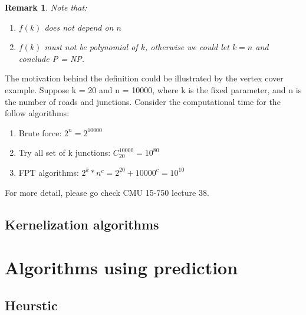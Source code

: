 \documentclass[12pt]{article}
\newtheorem*{remark}{Remark}
\begin{document}
\begin{remark}
    Note that:
    \begin{enumerate}
        \item $f(k)$ does not depend on $n$
        \item $f(k)$ must not be polynomial of $k$, otherwise we could let $k=n$ and conclude P = NP. 
    \end{enumerate}
\end{remark}
\noindent The motivation behind the definition could be illustrated by the vertex cover example. Suppose k = 20 and n = 10000, where k is the fixed parameter, and n is the number of roads and junctions. Consider the computational time for the follow algorithms:
\begin{enumerate}
    \item Brute force: $2^n = 2^{10000}$
    \item Try all set of k junctions: $C^{10000}_{20} = 10^{80}$
    \item FPT algorithms: $2^k * n^c = 2^{20} + 10000^c = 10^{10}$
\end{enumerate}
For more detail, please go check CMU 15-750 lecture 38.

\subsection{Kernelization algorithms}

\section{Algorithms using prediction}

\subsection{Heurstic}
\end{document}
